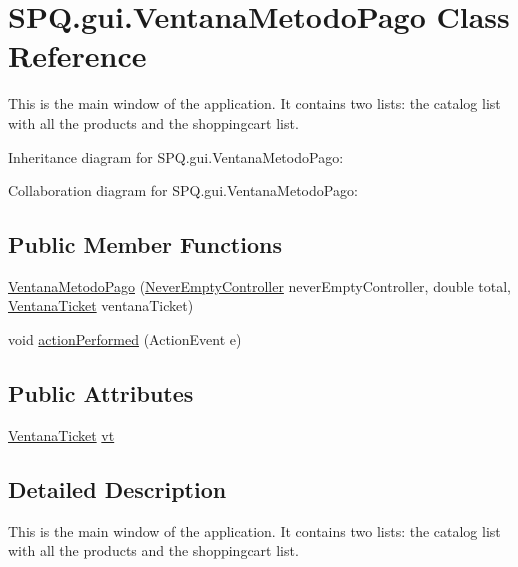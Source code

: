 \hypertarget{class_s_p_q_1_1gui_1_1_ventana_metodo_pago}{}\section{S\+P\+Q.\+gui.\+Ventana\+Metodo\+Pago Class Reference}
\label{class_s_p_q_1_1gui_1_1_ventana_metodo_pago}


This is the main window of the application. It contains two lists\+: the catalog list with all the products and the shoppingcart list.  




Inheritance diagram for S\+P\+Q.\+gui.\+Ventana\+Metodo\+Pago\+:


Collaboration diagram for S\+P\+Q.\+gui.\+Ventana\+Metodo\+Pago\+:
\subsection*{Public Member Functions}
\begin{DoxyCompactItemize}
\item 
\mbox{\hyperlink{class_s_p_q_1_1gui_1_1_ventana_metodo_pago_a26f9c85826129e253d02d7faa3b6f329}{Ventana\+Metodo\+Pago}} (\mbox{\hyperlink{class_s_p_q_1_1controller_1_1_never_empty_controller}{Never\+Empty\+Controller}} never\+Empty\+Controller, double total, \mbox{\hyperlink{class_s_p_q_1_1gui_1_1_ventana_ticket}{Ventana\+Ticket}} ventana\+Ticket)
\item 
void \mbox{\hyperlink{class_s_p_q_1_1gui_1_1_ventana_metodo_pago_a4cd83e327c681f60072c75b63bfb937d}{action\+Performed}} (Action\+Event e)
\end{DoxyCompactItemize}
\subsection*{Public Attributes}
\begin{DoxyCompactItemize}
\item 
\mbox{\hyperlink{class_s_p_q_1_1gui_1_1_ventana_ticket}{Ventana\+Ticket}} \mbox{\hyperlink{class_s_p_q_1_1gui_1_1_ventana_metodo_pago_aaad8d1f40f23d404c13feabdbf63e248}{vt}}
\end{DoxyCompactItemize}


\subsection{Detailed Description}
This is the main window of the application. It contains two lists\+: the catalog list with all the products and the shoppingcart list. 

